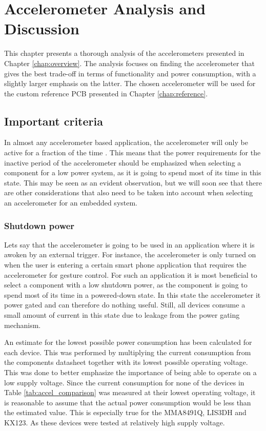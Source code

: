 \chapter{Accelerometer Analysis and Discussion}
\label{chap:analysis}

This chapter presents a thorough analysis of the accelerometers presented in Chapter \ref{chap:overview}. The analysis focuses on finding the accelerometer that gives the best trade-off in terms of functionality and power consumption, with a slightly larger emphasis on the latter. The chosen accelerometer will be used for the custom reference PCB presented in Chapter \ref{chap:reference}.

\section{Important criteria}

In almost any accelerometer based application, the accelerometer will only be active for a fraction of the time \cite{moldsvor15}. This means that the power requirements for the inactive period of the accelerometer should be emphasized when selecting a component for a low power system, as it is going to spend most of its time in this state. This may be seen as an evident observation, but we will soon see that there are other considerations that also need to be taken into account when selecting an accelerometer for an embedded system.

\subsection{Shutdown power}

Lets say that the accelerometer is going to be used in an application where it is awoken by an external trigger. For instance, the accelerometer is only turned on when the user is entering a certain smart phone application that requires the accelerometer for gesture control. For such an application it is most beneficial to select a component with a low shutdown power, as the component is going to spend most of its time in a powered-down state. In this state the accelerometer it power gated and can therefore do nothing useful. Still, all devices consume a small amount of current in this state due to leakage from the power gating mechanism.   

An estimate for the lowest possible power consumption has been calculated for each device. This was performed by multiplying the current consumption from the components datasheet together with its lowest possible operating voltage. This was done to better emphasize the importance of being able to operate on a low supply voltage. Since the current consumption for none of the devices in Table \ref{tab:accel_comparison} was measured at their lowest operating voltage, it is reasonable to assume that the actual power consumption would be less than the estimated value. This is especially true for the MMA8491Q, LIS3DH and KX123. As these devices were tested at relatively high supply voltage. 

